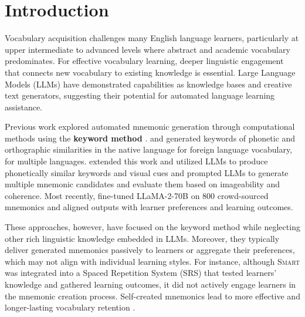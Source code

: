 \section{Introduction} \label{sec:intro}


Vocabulary acquisition challenges many English language learners, particularly at upper intermediate to advanced levels where abstract and academic vocabulary predominates. For effective vocabulary learning, deeper linguistic engagement that connects new vocabulary to existing knowledge is essential. Large Language Models (LLMs) have demonstrated capabilities as knowledge bases and creative text generators, suggesting their potential for automated language learning assistance.

Previous work explored automated mnemonic generation through computational methods using the \textbf{keyword method} \citep{atkinsonApplicationMnemonicKeyword1975}. \citet{savvaTransPhonerAutomatedMnemonic2014} and \citet{OzbalAUTOMATION2014} generated keywords of phonetic and orthographic similarities in the native language for foreign language vocabulary, for multiple languages. \citet{LeeSMARTPHONE2023} extended this work and utilized LLMs to produce phonetically similar keywords and visual cues and \citet{LeeEXPLORING2024} prompted LLMs to generate multiple mnemonic candidates and evaluate them based on imageability and coherence. Most recently, \citet{BalepurSMART2024} fine-tuned LLaMA-2-70B on 800 crowd-sourced mnemonics and aligned outputs with learner preferences and learning outcomes.

These approaches, however, have focused on the keyword method while neglecting other rich linguistic knowledge embedded in LLMs. Moreover, they typically deliver generated mnemonics passively to learners or aggregate their preferences, which may not align with individual learning styles. For instance, although \textsc{Smart} \citep{BalepurSMART2024} was integrated into a Spaced Repetition System (SRS) that tested learners' knowledge and gathered learning outcomes, it did not actively engage learners in the mnemonic creation process. Self-created mnemonics lead to more effective and longer-lasting vocabulary retention \citep{madanExploringWordMemorability2021}.

